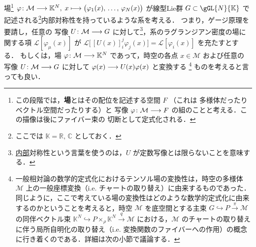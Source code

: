 \documentclass[TQFT_main]{subfiles}
\begin{document}
場\footnote{この段階では，\textbf{場}とはその配位を記述する空間 $F$ （これは \cinfty 多様体だったりベクトル空間だったりする）と \cinfty 写像 $\varphi \colon \mathcal{M} \longrightarrow F$ の組のことと考える．この描像は後にファイバー束の \cinfty 切断として定式化される．} $\varphi \colon \mathcal{M} \longrightarrow \mathbb{K}^N,\; x \longmapsto \bigl(\varphi_1(x),\, \dots,\, \varphi_N(x)\bigr)$ が線型Lie群 $G \subset \gGL{N}{\mathbb{K}}$ で記述される\footnote{ここでは $\mathbb{K} = \mathbb{R},\, \mathbb{C}$ としておく．}内部対称性を持っているような系を考える．
つまり，ゲージ原理を要請し，任意の \cinfty 写像 $U \colon \mathcal{M} \longrightarrow G$ に対して\footnote{\underline{内部}対称性という言葉を使うのは，$U$ が定数写像とは限らないことを意味する．}，系のラグランジアン密度の場に関する項 $\mathcal{L}[\varphi_\mu (x)]$ が $\mathcal{L}\bigl[\, [U(x)]^j_i \varphi_j (x) \bigr] = \mathcal{L}[\varphi_i (x)]$ を充たすとする．
もしくは，場 $\varphi \colon \mathcal{M} \longrightarrow \mathbb{K}^N$ であって，時空の各点 $x \in \mathcal{M}$ および任意の \cinfty 写像 $U \colon \mathcal{M} \longrightarrow G$ に対して $\varphi (x) \longrightarrow U(x) \varphi (x)$ と変換する
\footnote{
    一般相対論の数学的定式化におけるテンソル場の変換性は，時空の多様体 $\mathcal{M}$ 上の一般座標変換（i.e. チャートの取り替え）に由来するものであった．
    同じように，ここで考えている場の変換性はどのような数学的定式化に由来するのかということを考えると，時空 $\mathcal{M}$ を底空間とする主束 $G \hookrightarrow P \xrightarrow{\pi} \mathcal{M}$ の同伴ベクトル束 $\mathbb{K}^N \hookrightarrow P \times_\rho \mathbb{K}^N \xrightarrow{q} \mathcal{M}$ における，$\mathcal{M}$ のチャートの取り替えに伴う局所自明化の取り替え（i.e. 変換関数のファイバーへの作用）の概念に行き着くのである．詳細は次の小節で議論する．
}
ものを考えると言っても良い．
\end{document}
